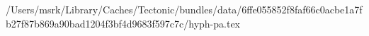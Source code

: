 /Users/msrk/Library/Caches/Tectonic/bundles/data/6ffe055852f8faf66c0acbe1a7fb27f87b869a90bad1204f3bf4d9683f597c7c/hyph-pa.tex